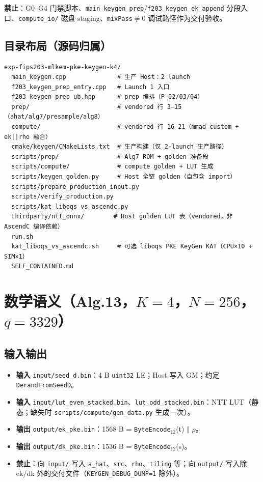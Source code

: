 \documentclass[UTF8,a4paper,11pt]{ctexart}
\begin{document}
\textbf{禁止}：G0--G4 门禁脚本、\texttt{main\_keygen\_prep}/\texttt{f203\_keygen\_ek\_append} 分段入口、\texttt{compute\_io/} 磁盘 staging、\texttt{mixPass}$\neq$0 调试路径作为交付验收。

\subsection{目录布局（源码归属）}

\begin{verbatim}
exp-fips203-mlkem-pke-keygen-k4/
  main_keygen.cpp              # 生产 Host：2 launch
  f203_keygen_prep_entry.cpp   # Launch 1 入口
  f203_keygen_prep_ub.hpp      # prep 编排（P-02/03/04）
  prep/                        # vendored 行 3–15（ahat/alg7/presample/alg8）
  compute/                     # vendored 行 16–21（mmad_custom + ek||rho 融合）
  cmake/keygen/CMakeLists.txt  # 生产构建（仅 2-launch 生产路径）
  scripts/prep/                # Alg7 ROM + golden 准备段
  scripts/compute/             # compute golden + LUT 生成
  scripts/keygen_golden.py     # Host 全链 golden（自包含 import）
  scripts/prepare_production_input.py
  scripts/verify_production.py
  scripts/kat_liboqs_vs_ascendc.py
  thirdparty/ntt_onnx/        # Host golden LUT 表（vendored，非 AscendC 编译依赖）
  run.sh
  kat_liboqs_vs_ascendc.sh     # 可选 liboqs PKE KeyGen KAT（CPU×10 + SIM×1）
  SELF_CONTAINED.md
\end{verbatim}

\section{数学语义（Alg.13，$K=4$，$N=256$，$q=3329$）}

\subsection{输入输出}

\begin{itemize}
  \item \textbf{输入} \texttt{input/seed\_d.bin}：4 B \texttt{uint32} LE；Host 写入 GM；约定 \texttt{DerandFromSeedD}。
  \item \textbf{输入} \texttt{input/lut\_even\_stacked.bin}、\texttt{lut\_odd\_stacked.bin}：NTT LUT（静态；缺失时 \texttt{scripts/compute/gen\_data.py} 生成一次）。
  \item \textbf{输出} \texttt{output/ek\_pke.bin}：1568 B = \texttt{ByteEncode$_{12}$}(t) $\Vert$ $\rho$。
  \item \textbf{输出} \texttt{output/dk\_pke.bin}：1536 B = \texttt{ByteEncode$_{12}$}(s)。
  \item \textbf{禁止}：向 \texttt{input/} 写入 \texttt{a\_hat}、\texttt{src}、\texttt{rho}、\texttt{tiling} 等；向 \texttt{output/} 写入除 ek/dk 外的交付文件（\texttt{KEYGEN\_DEBUG\_DUMP=1} 除外）。
\end{itemize}
\end{document}

